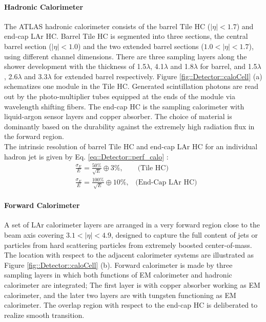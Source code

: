 \paragraph{Hadronic Calorimeter}
The ATLAS hadronic calorimeter consists of the barrel Tile HC ($|\eta|<1.7$) and end-cap LAr HC.
Barrel Tile HC is segmented into three sections, the central barrel section ($|\eta|<1.0$) and the two extended barrel sections ($1.0<|\eta|<1.7$), using different channel dimensions. 
There are three sampling layers along the shower development with the thickness of 1.5$\lambda$, 4.1$\lambda$ and 1.8$\lambda$ for barrel, and 1.5$\lambda$, 2.6$\lambda$ and 3.3$\lambda$ for extended barrel respectively. Figure \ref{fig::Detector::caloCell} (a) schematizes one module in the Tile HC. Generated scintillation photons are read out by the photo-multiplier tubes equipped at the ends of the module via wavelength shifting fibers. 
The end-cap HC is the sampling calorimeter with liquid-argon sensor layers and copper absorber. The choice of material is dominantly based on the durability against the extremely high radiation flux in the forward region. \\
 
The intrinsic resolution of barrel Tile HC and end-cap LAr HC for an individual hadron jet is given by Eq. \ref{eq::Detector::perf_calo} \cite{ATLAS_Tile_TDR}: \\
\begin{align}
& \frac{\sigma_E}{E} = \frac{50\%}{\sqrt{E}} \oplus 3\%, \,\,\,\,\,\,\,\,\,\,\,\,  \mbox{(Tile HC)} \\
& \frac{\sigma_E}{E} = \frac{100\%}{\sqrt{E}} \oplus 10\%,  \,\,\,\,\, \mbox{(End-Cap LAr HC)}
\label{eq::Detector::perf_calo}
\end{align}


\clearpage
\paragraph{Forward Calorimeter}
A set of LAr calorimeter layers are arranged in a very forward region close to the beam axis covering $3.1<|\eta|<4.9$, 
designed to capture the full content of jets or particles from hard scattering particles from extremely boosted center-of-mass. The location with respect to the adjacent calorimeter systems are illustrated as Figure \ref{fig::Detector::caloCell} (b).
Forward calorimeter is made by three sampling layers in which both functions of EM calorimeter and hadronic calorimeter are integrated; The first layer is with copper absorber working as EM calorimeter, and the later two layers are with tungsten functioning as EM calorimeter. The overlap region with respect to the end-cap HC is deliberated to realize smooth transition. \\


